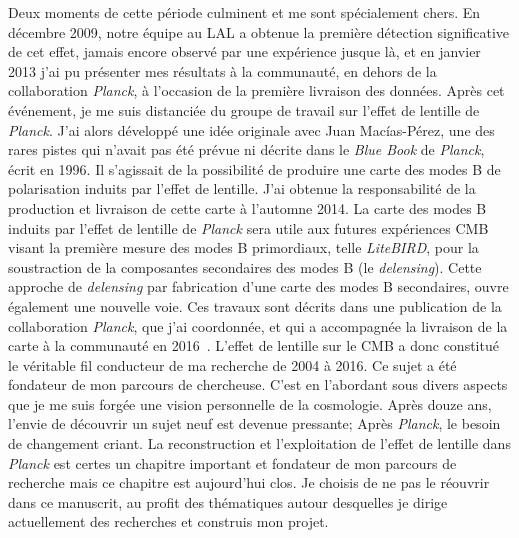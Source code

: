 \documentclass[a4paper, 11pt]{report}
\begin{document}
Deux moments de cette période culminent et me sont spécialement
chers. En décembre 2009, notre équipe au LAL a obtenue la première
détection significative de cet effet, jamais encore observé par une
expérience jusque là, et en janvier 2013 j'ai pu présenter mes
résultats à la communauté, en dehors de la collaboration \emph{Planck}, à
l'occasion de la première livraison des
données. Après cet événement, je me suis distanciée du groupe de
travail sur l'effet de lentille de \emph{Planck}. J'ai alors développé une idée
originale avec Juan Mac\'ias-P\'erez, une des
rares pistes qui n'avait pas été prévue ni décrite dans le
\emph{Blue Book} de \emph{Planck}, écrit en 1996. Il s'agissait de la
possibilité de produire une carte des modes B de polarisation induits par l'effet de
lentille. J'ai obtenue la responsabilité de la production et livraison
de cette carte à l'automne 2014. La carte des modes B induits par
l'effet de lentille de \emph{Planck} sera utile aux futures expériences CMB
visant la première mesure des modes B primordiaux, telle \emph{
  LiteBIRD}, pour la soustraction de la composantes secondaires des
modes B (le \emph{delensing}). Cette approche de \emph{delensing}
par fabrication d'une carte des modes B secondaires, ouvre également
une nouvelle voie. Ces travaux sont décrits dans une publication de la
collaboration \emph{Planck}, que j'ai coordonnée, et
qui a accompagnée la livraison de la carte à la communauté en
2016~\citep{Planck2016_Bmap}.
L'effet de lentille sur le CMB a donc constitué le véritable fil
conducteur de ma recherche de 2004 à 2016.
Ce sujet a été fondateur de mon parcours de chercheuse. C'est en
l'abordant sous divers aspects que je me suis forgée une vision
personnelle de la cosmologie. Après douze ans, l'envie de découvrir un
sujet neuf est devenue pressante; Après \emph{Planck}, le besoin de
changement criant. La reconstruction et l'exploitation de l'effet de
lentille dans \emph{Planck} est certes un chapitre important et fondateur de
mon parcours de recherche mais ce chapitre est aujourd'hui clos. Je
choisis de ne pas le réouvrir dans ce manuscrit, au profit des
thématiques autour desquelles je dirige actuellement des recherches et
construis mon projet.
\end{document}

